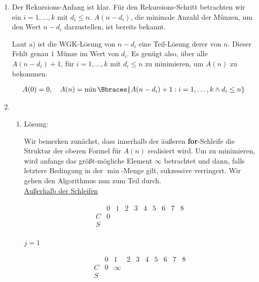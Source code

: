 \begin{solution}
\begin{enumerate}[label = \alph*]
  \item Der Rekursions-Anfang ist klar.
  Für den Rekursions-Schritt betrachten wir ein $i = 1, \dots, k$ mit $d_i \leq n$.
  $A(n - d_i)$, die minimale Anzahl der Münzen, um den Wert $n - d_i$ darzustellen, ist bereits bekannt.

  Laut a) ist die WGK-Lösung von $n - d_i$ eine Teil-Lösung derer von $n$.
  Dieser Fehlt genau $1$ Münze im Wert von $d_i$.
  Es genügt also, über alle $A(n - d_i) + 1$, für $i = 1, \dots, k$ mit $d_i \leq n$ zu minimieren, um $A(n)$ zu bekommen.

  \begin{align*}
    A(0) = 0,
    \quad
    A(n) = \min \Bbraces{A(n - d_i) + 1: i = 1, \dots, k \land d_i \leq n}
  \end{align*}

  \item \phantom{}

  \begin{enumerate}[label = \arabic*.]

    \item Lösung:

    Wir bemerken zunächst, dass innerhalb der äußeren \textbf{for}-Schleife die Struktur der oberen Formel für $A(n)$ realisiert wird.
    Um zu minimieren, wird anfangs das größt-mögliche Element $\infty$ betrachtet und dann, falls letztere Bedingung in der $\min$-Menge gilt, sukzessive verringert.
    Wir gehen den Algorithmus nun zum Teil durch. \\

    \underline{Außerhalb der Schleifen}

    \begin{align*}
      \begin{array}{c|c|c|c|c|c|c|c|c|c}
          & 0 & 1 & 2 & 3 & 4 & 5 & 6 & 7 & 8 \\ \hline
        C & 0 &   &   &   &   &   &   &   &   \\ \hline
        S &   &   &   &   &   &   &   &   &   \\
      \end{array}
    \end{align*}

    \underline{$j = 1$}

    \begin{align*}
      \begin{array}{c|c|c|c|c|c|c|c|c|c}
          & 0 & 1      & 2 & 3 & 4 & 5 & 6 & 7 & 8 \\ \hline
        C & 0 & \infty &   &   &   &   &   &   &   \\ \hline
        S &   &        &   &   &   &   &   &   &   \\
      \end{array}
    \end{align*}


\end{enumerate}
\end{enumerate}
\end{solution}

